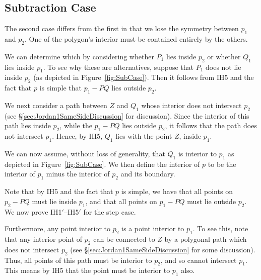 \subsection{Subtraction Case}
The second case differs from the first in that we lose the symmetry between $p_1$ and $p_2$. One of the polygon's interior must be contained entirely by the others. 

We can determine which by considering whether $P_1$ lies inside $p_2$ or whether $Q_1$ lies inside $p_1$. To see why these are alternatives, suppose that $P_1$ does not lie inside $p_2$ (as depicted in Figure~\ref{fig:SubCase}). Then it follows from IH5 and the fact that $p$ is simple that $p_1 - PQ$ lies outside $p_2$. 

We next consider a path between $Z$ and $Q_1$ whose interior does not intersect $p_2$ (see \S\ref{sec:Jordan1SameSideDiscussion} for discussion). Since the interior of this path lies inside $p_2$, while the $p_1 - PQ$ lies outside $p_2$, it follows that the path does not intersect $p_1$. Hence, by IH5, $Q_1$ lies with the point $Z$, inside $p_1$.

We can now assume, without loss of generality, that $Q_1$ is interior to $p_1$ as depicted in Figure~\ref{fig:SubCase}. We then define the interior of $p$ to be the interior of $p_1$ minus the interior of $p_2$ and its boundary. 

Note that by IH5 and the fact that $p$ is simple, we have that all points on $p_2 - PQ$ must lie inside $p_1$, and that all points on $p_1 - PQ$ must lie outside $p_2$. We now prove IH1$'$--IH5$'$ for the step case.

Furthermore, any point interior to $p_2$ is a point interior to $p_1$. To see this, note that any interior point of $p_2$ can be connected to $Z$ by a polygonal path which does not intersect $p_2$ (see \S\ref{sec:Jordan1SameSideDiscussion} for some discussion). Thus, all points of this path must be interior to $p_2$, and so cannot intersect $p_1$. This means by IH5 that the point must be interior to $p_1$ also.

